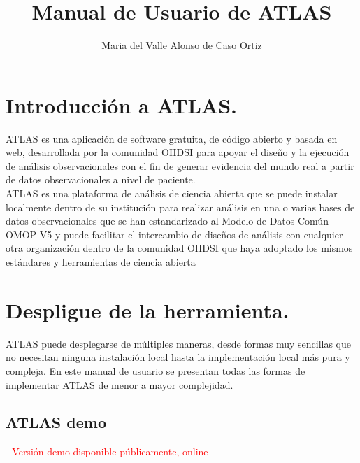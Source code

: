 \documentclass{article}
\title{Manual de Usuario de ATLAS}
\author{Maria del Valle Alonso de Caso Ortiz}
\begin{document}
\maketitle



\section{Introducción a ATLAS.}

ATLAS es una aplicación de software gratuita, de código abierto y basada en web, desarrollada por la comunidad OHDSI para apoyar el diseño y la ejecución de análisis observacionales con el fin de generar evidencia del mundo real a partir de datos observacionales a nivel de paciente. \\

ATLAS es una plataforma de análisis de ciencia abierta que se puede instalar localmente dentro de su institución para realizar análisis en una o varias bases de datos observacionales que se han estandarizado al Modelo de Datos Común OMOP V5 y puede facilitar el intercambio de diseños de análisis con cualquier otra organización dentro de la comunidad OHDSI que haya adoptado los mismos estándares y herramientas de ciencia abierta \cite{OHDSIAtlasWiki}



\section{Despligue de la herramienta.}

ATLAS puede desplegarse de múltiples maneras, desde formas muy sencillas que no necesitan ninguna instalación local hasta la implementación local más pura y compleja. En este manual de usuario se presentan todas las formas de implementar ATLAS de menor a mayor complejidad.

\subsection{ATLAS demo}

\textcolor{red}{- Versión demo disponible públicamente, online}
\end{document}
